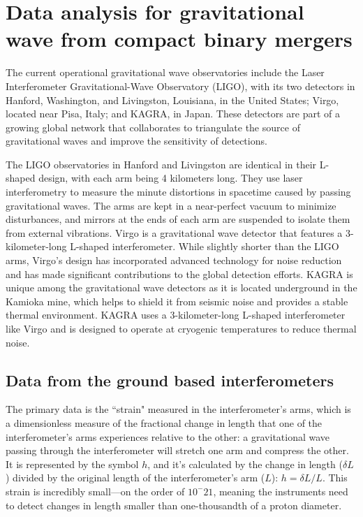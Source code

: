 \chapter{Data analysis for gravitational wave from compact binary mergers}

The current operational gravitational wave observatories include the Laser Interferometer Gravitational-Wave Observatory (LIGO), with its two detectors in Hanford, Washington, and Livingston, Louisiana, in the United States; Virgo, located near Pisa, Italy; and KAGRA, in Japan. These detectors are part of a growing global network that collaborates to triangulate the source of gravitational waves and improve the sensitivity of detections.

The LIGO observatories in Hanford and Livingston are identical in their L-shaped design, with each arm being 4 kilometers long. They use laser interferometry to measure the minute distortions in spacetime caused by passing gravitational waves. The arms are kept in a near-perfect vacuum to minimize disturbances, and mirrors at the ends of each arm are suspended to isolate them from external vibrations. Virgo is a gravitational wave detector that features a 3-kilometer-long L-shaped interferometer. While slightly shorter than the LIGO arms, Virgo's design has incorporated advanced technology for noise reduction and has made significant contributions to the global detection efforts. KAGRA is unique among the gravitational wave detectors as it is located underground in the Kamioka mine, which helps to shield it from seismic noise and provides a stable thermal environment. KAGRA uses a 3-kilometer-long L-shaped interferometer like Virgo and is designed to operate at cryogenic temperatures to reduce thermal noise.


\section{Data from the ground based interferometers}
The primary data is the ``strain" measured in the interferometer's arms, which is a dimensionless measure of the fractional change in length that one of the interferometer's arms experiences relative to the other: a gravitational wave passing through the interferometer will stretch one arm and compress the other. It is represented by the symbol $h$, and it's calculated by the change in length ($\delta L$) divided by the original length of the interferometer’s arm ($L$): $h = \delta L / L$. This strain is incredibly small—on the order of $10^-{21}$, meaning the instruments need to detect changes in length smaller than one-thousandth of a proton diameter.
